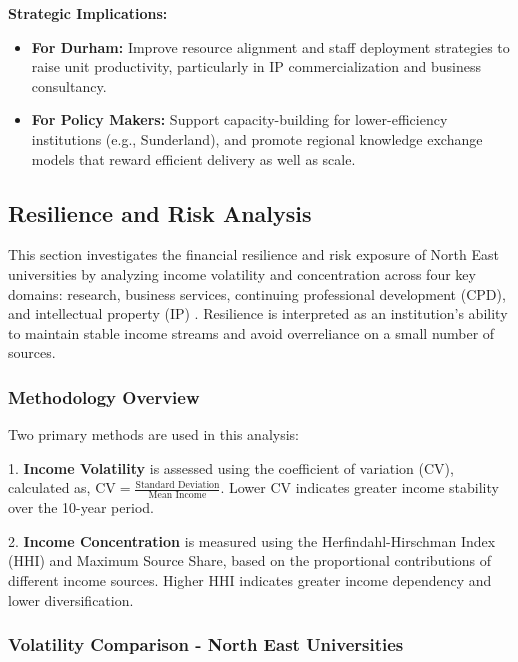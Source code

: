 \documentclass[journal,onecolumn, 10pt,draftclsnofoot]{IEEEtran}
\begin{document}
\textbf{Strategic Implications:}
\begin{itemize}
    \item \textbf{For Durham:} Improve resource alignment and staff deployment strategies to raise unit productivity, particularly in IP commercialization and business consultancy.
    
    \item \textbf{For Policy Makers:} Support capacity-building for lower-efficiency institutions (e.g., Sunderland), and promote regional knowledge exchange models that reward efficient delivery as well as scale.
\end{itemize}

\subsection{Resilience and Risk Analysis}

This section investigates the financial resilience and risk exposure of North East universities by analyzing income volatility and concentration across four key domains: research, business services, continuing professional development (CPD), and intellectual property (IP) \cite{markowitz1952portfolio,sharpe1964capital}. Resilience is interpreted as an institution's ability to maintain stable income streams and avoid overreliance on a small number of sources.

\subsubsection{Methodology Overview}

Two primary methods are used in this analysis:

1. \textbf{Income Volatility} is assessed using the coefficient of variation (CV), calculated as, $\mathrm{CV}=\frac{\text{Standard Deviation}}{\text{Mean Income}}$. Lower CV indicates greater income stability over the 10-year period.

2. \textbf{Income Concentration} is measured using the Herfindahl-Hirschman Index (HHI) and Maximum Source Share, based on the proportional contributions of different income sources. Higher HHI indicates greater income dependency and lower diversification.

\subsubsection{Volatility Comparison - North East Universities}
\end{document}
